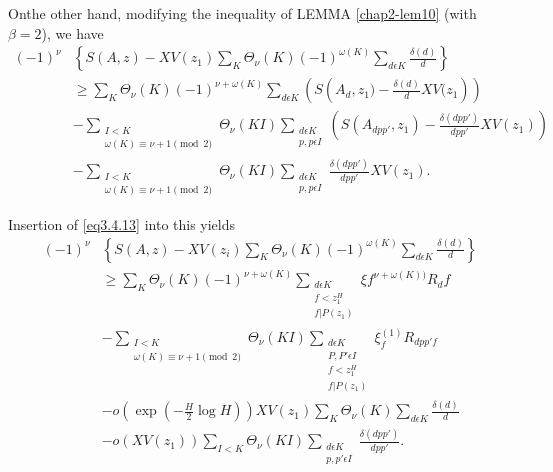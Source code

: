 On\pageoriginale the other hand, modifying the inequality of LEMMA
\ref{chap2-lem10} (with $\beta = 2$), we have 
\begin{align*}
(-1)^{\nu} &\left\{S(A, z) - XV(z_1) \sum_{K} \Theta_\nu (K)
(-1)^{\omega(K)} \sum_{d \epsilon  K} \frac{\delta(d)}{d} \right\} \\
  & \geq \sum_{K} \Theta_\nu (K) (-1)^{\nu + \omega (K)} \sum_{d
    \epsilon  K} \left(S\left(A_d, z_1) - \frac{\delta (d)}{d} XV
  (z_1\right)\right)\\  
  & - \sum_{\substack{I < K \\ \omega (K) \equiv \nu + 1 \pmod{2}}}
  \Theta_\nu (KI) \sum_{\substack{d \epsilon  K\\ p, p \epsilon 
      I}} \left(S(A_{dpp'}, z_1) - \frac{\delta (dpp')}{dpp'} XV (z_1)\right)\\ 
  & -\sum_{\substack{I < K \\ \omega (K) \equiv \nu + 1 \pmod{2}}}
  \Theta_\nu (KI) \sum_{\substack{d \epsilon  K\\ p, p \epsilon 
      I}}\frac{\delta (dpp')}{dpp'} XV (z_1). 
\end{align*}

Insertion of \eqref{eq3.4.13} into this yields
\begin{align*}
  (-1)^{\nu} & \left\{ S(A, z) - XV(z_i) \sum_{K} \Theta_\nu (K)
  (-1)^{\omega (K)} \sum_{d \epsilon  K} \frac{\delta (d)}{d}\right\}\\ 
  &\geq \sum_{K} \Theta_\nu (K) (-1)^{\nu + \omega (K)}
  \sum_{\substack {d \epsilon  K\\ f < z^H_1 \\  f | P (z_1)}} \xi
  f^{\nu + \omega (K))} R_df \tag{3.4.14}\label{eq3.4.14}\\ 
  & -  \sum_{\substack{I < K\\ \omega(K) \equiv \nu + 1 \pmod{2}}}
  \Theta_\nu (KI) \sum_{\substack{d \epsilon  K\\ P,P' \epsilon 
      I\\ f < z^H_1\\ f| P(z_1)}} \xi^{(1)}_f R_{dpp'f}\\ 
  & - o\left(\exp \left(-\frac{H}{2} \log H\right)\right) XV (z_1)
  \sum_{K} \Theta_\nu (K) \sum_{d \epsilon  K} \frac{\delta
    (d)}{d}\\ 
  & - o(XV(z_1)) \sum_{I < K} \Theta_\nu (KI) \sum_{\substack{d
      \epsilon  K\\ p, p' \epsilon  I}} \frac{\delta
    (dpp')}{dpp'}. 
\end{align*}\pageoriginale

